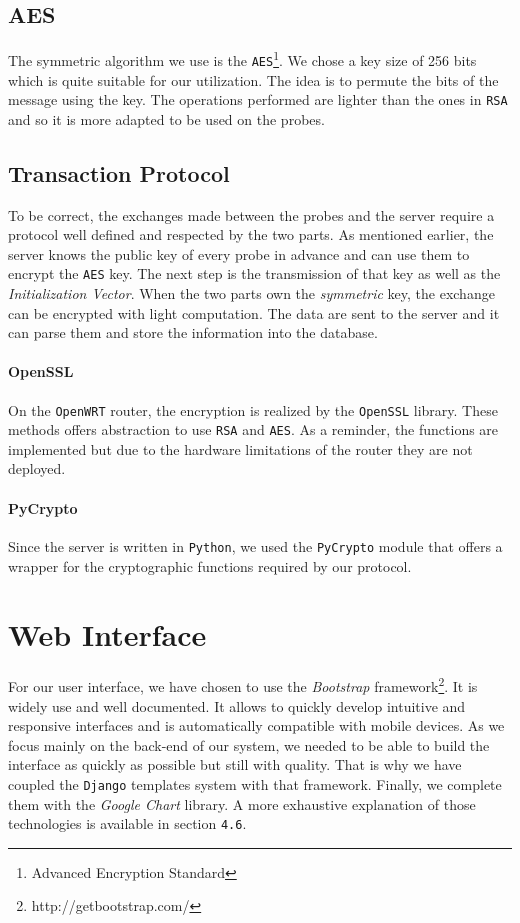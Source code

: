 \subsection{AES}
The symmetric algorithm we use is the \texttt{AES}\footnote{Advanced Encryption Standard}. We chose a key size of 256 bits which is quite suitable for our utilization. The idea is to permute the bits of the message using the key. The operations performed are lighter than the ones in \texttt{RSA} and so it is more adapted to be used on the probes.


\subsection{Transaction Protocol}
To be correct, the exchanges made between the probes and the server require a protocol well defined and respected by the two parts. As mentioned earlier, the server knows the public key of every probe in advance and can use them to encrypt the \texttt{AES} key. The next step is the transmission of that key as well as the \emph{Initialization Vector}. When the two parts own the \emph{symmetric} key, the exchange can be encrypted with light computation. The data are sent to the server and it can parse them and store the information into the database.

\paragraph*{OpenSSL}
On the \texttt{OpenWRT} router, the encryption is realized by the \texttt{OpenSSL} library. These methods offers abstraction to use \texttt{RSA} and \texttt{AES}. As a reminder, the functions are implemented but due to the hardware limitations of the router they are not deployed.

\paragraph*{PyCrypto} Since the server is written in \texttt{Python}, we used the \texttt{PyCrypto} module that offers a wrapper for the cryptographic functions required by our protocol.

\section{Web Interface}
For our user interface, we have chosen to use the \emph{Bootstrap} framework\footnote{http://getbootstrap.com/}. It is widely use and well documented. It allows to quickly develop intuitive and responsive interfaces and is automatically compatible with mobile devices. As we focus mainly on the back-end of our system, we needed to be able to build the interface as quickly as possible but still with quality. That is why we have coupled the \texttt{Django} templates system with that framework. Finally, we complete them with the \emph{Google Chart} library. A more exhaustive explanation of those technologies is available in section \texttt{4.6}.


